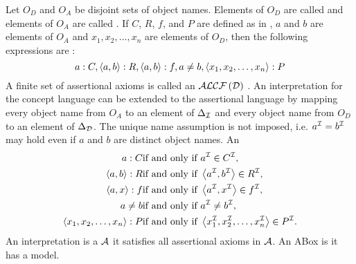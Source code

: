 \begin{defi}
Let $O_D$ and $O_A$ be disjoint sets of object names. Elements of $O_D$ are called  and elements of $O_A$ are called . If $C$, $R$, $f$, and $P$ are defined as in , $a$ and $b$ are elements of $O_A$ and $x_1,x_2,\ldots,x_n$ are elements of $O_D$, then the following expressions are :
\begin{equation}
a:C,\left\langle a,b\right\rangle:R,\left\langle a,b\right\rangle:f,a\neq b,\left\langle x_1,x_2,\ldots,x_n\right\rangle:P
\end{equation}
A finite set of assertional axioms is called an $\mathcal{A}\mathcal{L}\mathcal{C}\mathcal{F}\left(\mathcal{D}\right)$ . An interpretation for the concept language can be extended to the assertional language by mapping every object name from $O_A$ to an element of $\Delta_{\mathcal{I}}$ and every object name from $O_D$ to an element of $\Delta_{\mathcal{D}}$. The unique name assumption is not imposed, i.e. $a^{\mathcal{I}}=b^{\mathcal{I}}$ may hold even if $a$ and $b$ are distinct object names. An 
\begin{align}
a:C&\mbox{if and only if{} }a^{\mathcal{I}}\in C^{\mathcal{I}},\\
\left\langle a,b\right\rangle:R&\mbox{if and only if{} }\left\langle a^{\mathcal{I}},b^{\mathcal{I}}\right\rangle\in R^{\mathcal{I}},\\
\left\langle a,x\right\rangle:f&\mbox{if and only if{} }\left\langle a^{\mathcal{I}},x^{\mathcal{I}}\right\rangle\in f^{\mathcal{I}},\\
a\neq b&\mbox{if and only if{} }a^{\mathcal{I}}\neq b^{\mathcal{I}},\\
\left\langle x_1,x_2,\ldots,x_n\right\rangle:P&\mbox{if and only if{} }\left\langle x_1^{\mathcal{I}},x_2^{\mathcal{I}},\ldots,x_n^{\mathcal{I}}\right\rangle\in P^{\mathcal{I}}.
\end{align}
An interpretation is a  $\mathcal{A}$ \iffTx{} it satisfies all assertional axioms in $\mathcal{A}$. An ABox is  \iffTx{} it has a model.
\cite{conf/ijcai/Lutz99}
\end{defi}

